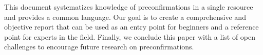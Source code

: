\documentclass[a4paper]{article}
\theoremstyle{boldstyle}
\newcommand{\cm}[1]{\textcolor{blue}{\textbf{Conor:} #1}}
\newcommand{\lo}[1]{\textcolor{orange}{\textbf{Lin:} #1}}
\newcommand{\dk}[1]{\textcolor{cyan}{\textbf{Demetris:} #1}}
\begin{document}



This document systematizes knowledge of preconfirmations in a single resource and provides a common language. Our goal is to create a comprehensive and objective report that can be used as an entry point for beginners and a reference point for experts in the field. Finally, we conclude this paper with a list of open challenges to encourage future research on preconfirmations.
\end{document}
